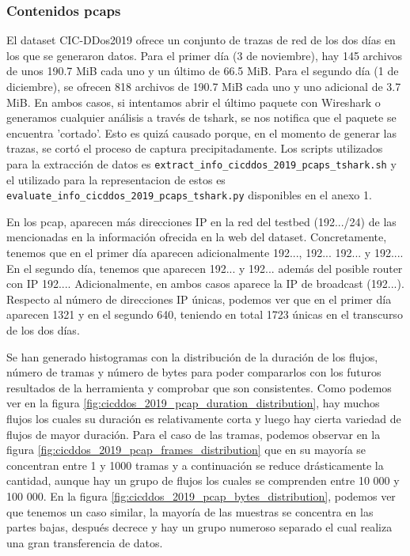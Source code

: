 \subsubsection{Contenidos pcaps}

El dataset CIC-DDos2019 ofrece un conjunto de trazas de red de los dos días en los que se generaron datos. Para el primer día (3 de noviembre), hay 145 archivos de unos 190.7 MiB cada uno y un último de 66.5 MiB. Para el segundo día (1 de diciembre), se ofrecen 818 archivos de 190.7 MiB cada uno y uno adicional de 3.7 MiB. En ambos casos, si intentamos abrir el último paquete con Wireshark o generamos cualquier análisis a través de tshark, se nos notifica que el paquete se encuentra 'cortado'. Esto es quizá causado porque, en el momento de generar las trazas, se cortó el proceso de captura precipitadamente. Los scripts utilizados para la extracción de datos es \texttt{extract\_info\_cicddos\_2019\_pcaps\_tshark.sh} y el utilizado para la representacion de estos es \texttt{evaluate\_info\_cicddos\_2019\_pcaps\_tshark.py} disponibles en el anexo 1.

En los pcap, aparecen más direcciones IP en la red del testbed (192.../24) de las mencionadas en la información ofrecida en la web del dataset. Concretamente, tenemos que en el primer día aparecen adicionalmente 192..., 192... 192... y 192.... En el segundo día, tenemos que aparecen 192... y 192... además del posible router con IP 192.... Adicionalmente, en ambos casos aparece la IP de broadcast (192...). Respecto al número de direcciones IP únicas, podemos ver que en el primer día aparecen 1321 y en el segundo 640, teniendo en total 1723 únicas en el transcurso de los dos días. 

Se han generado histogramas con la distribución de la duración de los flujos, número de tramas y número de bytes para poder compararlos con los futuros resultados de la herramienta y comprobar que son consistentes. Como podemos ver en la figura \ref{fig:cicddos_2019_pcap_duration_distribution}, hay muchos flujos los cuales su duración es relativamente corta y luego hay cierta variedad de flujos de mayor duración. Para el caso de las tramas, podemos observar en la figura \ref{fig:cicddos_2019_pcap_frames_distribution} que en su mayoría se concentran entre 1 y 1000 tramas y a continuación se reduce drásticamente la cantidad, aunque hay un grupo de flujos los cuales se comprenden entre 10 000 y 100 000. En la figura \ref{fig:cicddos_2019_pcap_bytes_distribution}, podemos ver que tenemos un caso similar, la mayoría de las muestras se concentra en las partes bajas, después decrece y hay un grupo numeroso separado el cual realiza una gran transferencia de datos.

